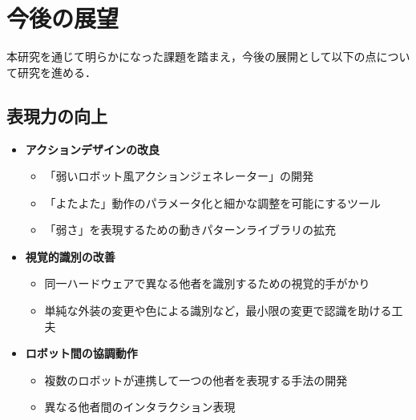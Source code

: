 \documentclass{cuxarticle}
\begin{document}
\section{今後の展望}
本研究を通じて明らかになった課題を踏まえ，今後の展開として以下の点について研究を進める．

\subsection{表現力の向上}
\begin{itemize}
  \item \textbf{アクションデザインの改良}
    \begin{itemize}
      \item 「弱いロボット風アクションジェネレーター」の開発
      \item 「よたよた」動作のパラメータ化と細かな調整を可能にするツール
      \item 「弱さ」を表現するための動きパターンライブラリの拡充
    \end{itemize}

  \item \textbf{視覚的識別の改善}
    \begin{itemize}
      \item 同一ハードウェアで異なる他者を識別するための視覚的手がかり
      \item 単純な外装の変更や色による識別など，最小限の変更で認識を助ける工夫
    \end{itemize}

  \item \textbf{ロボット間の協調動作}
    \begin{itemize}
      \item 複数のロボットが連携して一つの他者を表現する手法の開発
      \item 異なる他者間のインタラクション表現
    \end{itemize}
\end{itemize}
\end{document}
